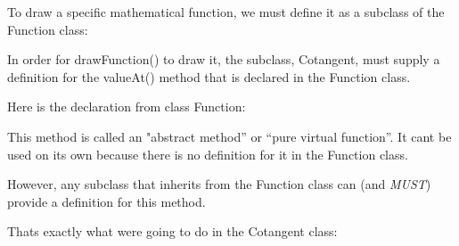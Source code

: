 To draw a specific mathematical function, we must define it as a subclass of the {\ttfamily Function} class\+:


\begin{DoxyCode}{0}
\DoxyCodeLine{\textcolor{preprocessor}{\#include <tsgl.h>}}
\DoxyCodeLine{}
\DoxyCodeLine{\textcolor{comment}{//This is the .h file}}
\DoxyCodeLine{\};}
\end{DoxyCode}


In order for {\ttfamily draw\+Function()} to draw it, the subclass, {\ttfamily Cotangent}, must supply a definition for the {\ttfamily value\+At()} method that is declared in the {\ttfamily Function} class. ~\newline


Here is the declaration from class {\ttfamily Function}\+:


\begin{DoxyCode}{0}
\end{DoxyCode}


This method is called an "abstract method” or “pure virtual function”. It can\textquotesingle{}t be used on its own because there is no definition for it in the {\ttfamily Function} class.

However, any subclass that inherits from the {\ttfamily Function} class can (and {\itshape M\+U\+ST}) provide a definition for this method.

That\textquotesingle{}s exactly what we\textquotesingle{}re going to do in the {\ttfamily Cotangent} class\+:


\begin{DoxyCode}{0}
\DoxyCodeLine{\textcolor{preprocessor}{\#include <tsgl.h>}}
\DoxyCodeLine{}
\DoxyCodeLine{ \textcolor{comment}{//This is the .h file}}
\DoxyCodeLine{ \textcolor{keyword}{public}:}
\DoxyCodeLine{\};}
\end{DoxyCode}



\begin{DoxyCode}{0}
\DoxyCodeLine{\textcolor{preprocessor}{\#include "Cotangent.h"}}
\DoxyCodeLine{}
\DoxyCodeLine{\textcolor{comment}{//This is the .cpp file}}
\DoxyCodeLine{\}}
\end{DoxyCode}


